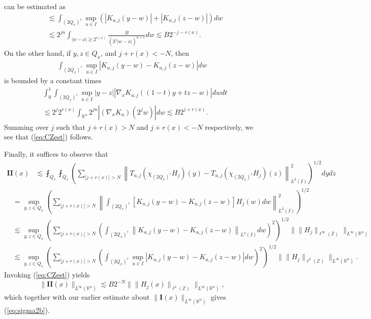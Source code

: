 \documentclass[12pt,leqno]{amsart}
\def\R{\mathbb{R}}
\def\Z{\mathbb{Z}}
\theoremstyle{plain}
\numberwithin{equation}{section}
\begin{document}
can be estimated as
\begin{align*}
&\lesssim \int_{(2Q_x)^c} \sup_{u \in I} (| K_{u,j}(y-w) | + | K_{u,j}(z-w) | ) dw \\
&\lesssim 2^{jn} \int_{|w-x| \gtrsim 2^{r(x)}} \frac{B}{(2^j |w-x|)^{n+1}}  dw\lesssim B 2^{-j-r(x)}.
\end{align*}
On the other hand, if $y, z \in Q_x$, and $j + r(x) < -N$, then 
\begin{align*}
\int_{(2Q_x)^c} \sup_{u \in I} | K_{u,j}(y-w) - K_{u,j}(z-w) | dw
\end{align*}
is bounded by a constant times
\begin{align*}
&\int_0^1 \int_{(2Q_x)^c} \sup_{u \in I} |y-z| |\nabla_x K_{u,j} ((1-t)y+tz-w)| dw dt \\
&\lesssim 2^j 2^{r(x)} \int_{\R^n} 2^{jn} |(\nabla_x K_u)(2^j w)|  dw \lesssim B 2^{j+r(x)}.
\end{align*}
Summing over $j$ such that $j + r(x) > N$ and $j + r(x) < -N$ respectively, we see that (\ref{eq:CZest}) follows.

Finally, it suffices to observe that
\begin{align*}
\mathbf{II}(x) & \lesssim \fint_{Q_x} \fint_{Q_x} \left( \sum_{|j+r(x)| > N} \left\|T_{u,j} (\chi_{(2Q_x)^c} H_j)(y) - T_{u,j} (\chi_{(2Q_x)^c} H_j)(z) \right\|_{L^2(I)}^2 \right)^{1/2} dy dz
\end{align*}
\begin{align*}
& = \sup_{y, z \in Q_x} \left( \sum_{|j+r(x)| > N} \left\| \int_{(2Q_x)^c} [K_{u,j}(y-w) - K_{u,j}(z-w)] H_j(w) dw \right\|_{L^2(I)}^2 \right)^{1/2} \\
& \lesssim \sup_{y, z \in Q_x} \left( \sum_{|j+r(x)| > N} \left( \int_{(2Q_x)^c} \left\| K_{u,j}(y-w) - K_{u,j}(z-w) \right\|_{L^2(I)} dw \right)^2 \right)^{1/2} \|\|H_j\|_{\ell^{\infty}(\Z)} \|_{L^{\infty}(\R^n)} \\
& \lesssim \sup_{y, z \in Q_x} \left( \sum_{|j+r(x)| > N} \left( \int_{(2Q_x)^c} \sup_{u \in I} | K_{u,j}(y-w) - K_{u,j}(z-w) | dw \right)^2 \right)^{1/2} \|\|H_j\|_{\ell^2(\Z)} \|_{L^{\infty}(\R^n)}.
\end{align*}
Invoking (\ref{eq:CZest}) yields
\[
\|\mathbf{II}(x)\|_{L^{\infty}(\R^n)} \lesssim B 2^{-N} \| \|H_j(x)\|_{\ell^2(\Z)} \|_{L^{\infty}(\R^n)},
\]
which together with our earlier estimate about $\|\mathbf{I}(x)\|_{L^{\infty}(\R^n)}$ gives (\ref{eq:sigma2b}).
\end{document}
